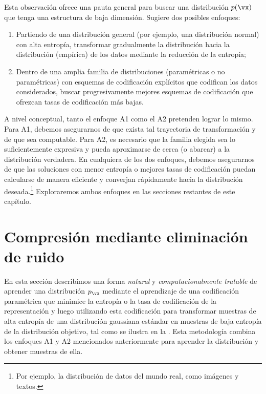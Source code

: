 \documentclass[../../book-main.tex]{subfiles}
\begin{document}
Esta observación ofrece una pauta general para buscar una
distribución \(p(\vx)\) que tenga una estructura de baja dimensión.
Sugiere dos posibles enfoques:
\begin{enumerate}[label={A\arabic*.}, leftmargin=*]
    \item Partiendo de una distribución general (por ejemplo, una distribución
        normal) con alta entropía, transformar gradualmente la
        distribución hacia la distribución (empírica) de los datos
        mediante la reducción de la entropía; 
    \item Dentro de una amplia familia de distribuciones (paramétricas o no paramétricas)
        con esquemas de codificación explícitos que codifican los
        datos considerados, buscar progresivamente mejores esquemas de codificación
        que ofrezcan tasas de codificación más bajas. 
\end{enumerate}
A nivel conceptual, tanto el enfoque A1 como el A2 pretenden lograr lo mismo.
Para A1, debemos asegurarnos de que exista tal trayectoria de transformación y de que sea
computable. Para A2, es necesario que la familia elegida sea lo suficientemente expresiva
y pueda aproximarse de cerca (o abarcar) a la distribución verdadera. En cualquiera de 
los dos enfoques, debemos asegurarnos de que las soluciones con menor entropía 
o mejores tasas de codificación puedan calcularse de manera eficiente
y converjan rápidamente hacia la distribución deseada.\footnote{Por ejemplo, 
la distribución de datos del mundo real, como imágenes y textos.} Exploraremos
ambos enfoques en las secciones restantes de este capítulo.

\section{Compresión mediante eliminación de ruido}\label{sub:compression_denoising}

En esta sección describimos una forma \textit{natural} y
\textit{computacionalmente tratable} de aprender una distribución
\(p_{\vx}\) mediante el aprendizaje de una codificación paramétrica que minimice la
entropía o la tasa de codificación de la representación y luego utilizando esta codificación
para transformar muestras de alta entropía de una distribución gaussiana estándar en
muestras de baja entropía de la distribución objetivo, tal como se ilustra en
la . Esta metodología combina los enfoques
A1 y A2 mencionados anteriormente para aprender la distribución y obtener muestras de ella.
\end{document}
